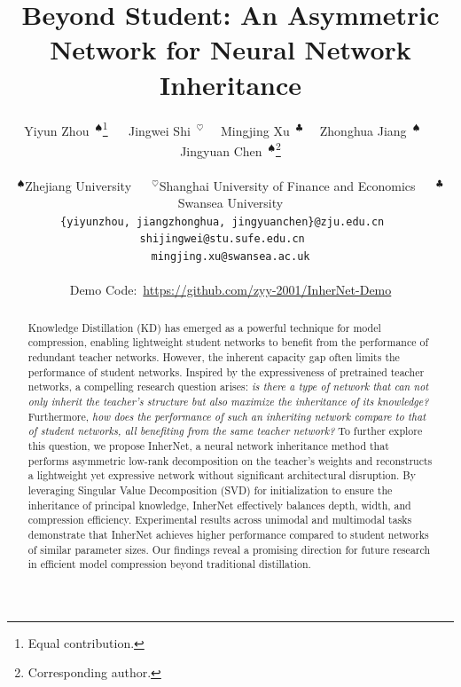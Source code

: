 \documentclass{article} %
\title{Beyond Student: An Asymmetric Network for Neural Network Inheritance}
\author{Yiyun Zhou~$^{\spadesuit}$\thanks{Equal contribution.} ~~ Jingwei Shi~$^{\heartsuit}$\footnotemark[1] ~~ Mingjing Xu~$^{\clubsuit}$\footnotemark[1] ~~ Zhonghua Jiang~$^{\spadesuit}$ ~~ Jingyuan Chen~$^{\spadesuit}$\thanks{Corresponding author.} \\\\
$^\spadesuit$Zhejiang University ~~ $^{\heartsuit}$Shanghai University of Finance and Economics ~~ $^{\clubsuit}$ Swansea University \\
\texttt{\{yiyunzhou, jiangzhonghua, jingyuanchen\}@zju.edu.cn} ~~ \texttt{shijingwei@stu.sufe.edu.cn} ~~ \\ \texttt{mingjing.xu@swansea.ac.uk} \\\\
Demo Code:~\url{https://github.com/zyy-2001/InherNet-Demo}
}
\begin{document}
\theoremstyle{definition}                %
\newtheorem{assumption}{Assumption}[section]   %
\newtheorem{definition}{Definition}[section]

\theoremstyle{plain}                     %
\newtheorem{theorem}{Theorem}[section]
\newtheorem{lemma}[theorem]{Lemma}       %
\newtheorem{proposition}[theorem]{Proposition}
\newtheorem{corollary}[theorem]{Corollary}

\theoremstyle{remark}                    %
\newtheorem{remark}{Remark}[section]



\maketitle


\begin{abstract}
Knowledge Distillation (KD) has emerged as a powerful technique for model compression, enabling lightweight student networks to benefit from the performance of redundant teacher networks. However, the inherent capacity gap often limits the performance of student networks. Inspired by the expressiveness of pretrained teacher networks, a compelling research question arises: \textit{is there a type of network that can not only inherit the teacher's structure but also maximize the inheritance of its knowledge?} Furthermore, \textit{how does the performance of such an inheriting network compare to that of student networks, all benefiting from the same teacher network?} To further explore this question, we propose InherNet, a neural network inheritance method that performs asymmetric low-rank decomposition on the teacher's weights and reconstructs a lightweight yet expressive network without significant architectural disruption. By leveraging Singular Value Decomposition (SVD) for initialization to ensure the inheritance of principal knowledge, InherNet effectively balances depth, width, and compression efficiency. Experimental results across unimodal and multimodal tasks demonstrate that InherNet achieves higher performance compared to student networks of similar parameter sizes. Our findings reveal a promising direction for future research in efficient model compression beyond traditional distillation.
\end{abstract}
\end{document}
